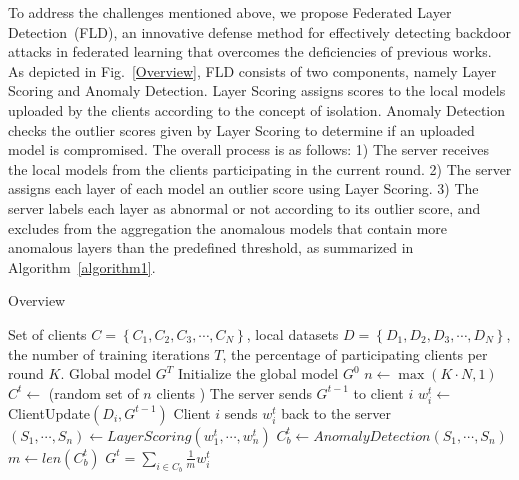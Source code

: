 {To address the challenges mentioned above, we propose Federated Layer Detection~(FLD), an innovative defense method for effectively detecting backdoor attacks in federated learning that overcomes the deficiencies of previous works. As depicted in Fig.~\ref{Overview}, FLD consists of two components, namely Layer Scoring and Anomaly Detection. Layer Scoring assigns scores to the local models uploaded by the clients according to the concept of isolation. Anomaly Detection checks the outlier scores given by Layer Scoring to determine if an uploaded model is compromised. The overall process is as follows: 1) The server receives the local models from the clients participating in the current round. 2) The server assigns each layer of each model an outlier score using Layer Scoring. 3) The server labels each layer as abnormal or not according to its outlier score, and excludes from the aggregation the anomalous models that contain more anomalous layers than the predefined threshold, as summarized in Algorithm~\ref{algorithm1}.
\begin{algorithm}
    \caption{Overview}\label{algorithm1}
    \begin{algorithmic} [1]
        \algrenewcommand{}
        \Require Set of clients $ C = \left \{ C_{1},C_{2},C_{3},\cdots,C_{N}  \right \} $, local datasets $ D = \left \{ D_{1},D_{2},D_{3},\cdots,D_{N} \right \}$, the number of training iterations $T$, the percentage of participating clients per round $K$.
        \algrenewcommand{} 
        \Require Global model $G^T $
        \State Initialize the global model $G^0 $
        \State $ n\gets \max \left ( K\cdot N,1  \right ) $ 
        \State $ C^{t} \gets $ (random set of $n$ clients )
        \State The server sends $G^{t-1}$ to client $i$
        \State $w_{i}^{t} \gets $ ClientUpdate$\left ( D_i, G^{t-1}  \right) $ 
        \State Client $i$ sends $w_{i}^{t}$ back to the server
        \EndFor
        \State $\left(S_{1} ,\cdots,S_{n}\right)\gets Layer Scoring\left(w_{1}^{t},\cdots,w_{n}^{t}\right)$
        \State $C_{b}^{t}\gets Anomaly Detection \left(S_{1} ,\cdots,S_{n}\right)$
        \State  $m\gets len\left ( C_b^t \right ) $
        \State  $  G^{t}=  \sum_{i\in  C_b}^{} \frac{1 }{m} w_{i}^{t}$
        \EndFor
    \end{algorithmic}
\end{algorithm}

}
